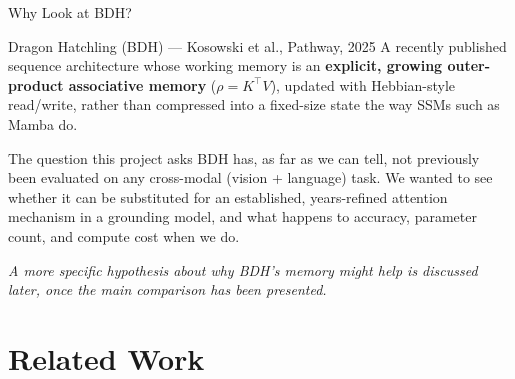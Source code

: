 \documentclass[aspectratio=169]{beamer}
\begin{document}
\begin{frame}{Why Look at BDH?}
  \small
  \begin{block}{Dragon Hatchling (BDH) — Kosowski et al., Pathway, 2025}
    \small A recently published sequence architecture whose working
    memory is an \textbf{explicit, growing outer-product associative
    memory} ($\rho = K^\top V$), updated with Hebbian-style
    read/write, rather than compressed into a fixed-size state the way
    SSMs such as Mamba do.
  \end{block}
  \vspace{0.15cm}
  \begin{center}
  \end{center}
  \vspace{0.1cm}
  \begin{block}{The question this project asks}
    \small BDH has, as far as we can tell, not previously been
    evaluated on any cross-modal (vision + language) task. We wanted
    to see whether it can be substituted for an established,
    years-refined attention mechanism in a grounding model, and what
    happens to accuracy, parameter count, and compute cost when we do.
  \end{block}
  \vspace{0.05cm}
  \footnotesize\textit{A more specific hypothesis about why BDH's
  memory might help is discussed later, once the main comparison has
  been presented.}
\end{frame}

\section{Related Work}
\end{document}
